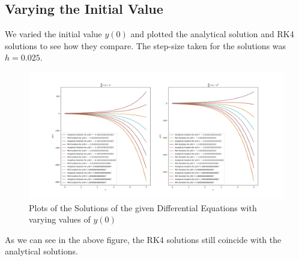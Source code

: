 \documentclass{scrartcl}
\begin{document}
\subsection{Varying the Initial Value}
We varied the initial value $y(0)$ and plotted the analytical solution and RK4 solutions to see how they compare. 
The step-size taken for the solutions was $h = 0.025$.

\begin{figure}[h]
    \centering
    \includegraphics[width=\linewidth]{"varied_initial_vals_RK4.png"}
    \caption{Plots of the Solutions of the given Differential Equations with varying values of $y(0)$}
\end{figure}

As we can see in the above figure, the RK4 solutions still coincide with the analytical solutions.

\clearpage
\end{document}
